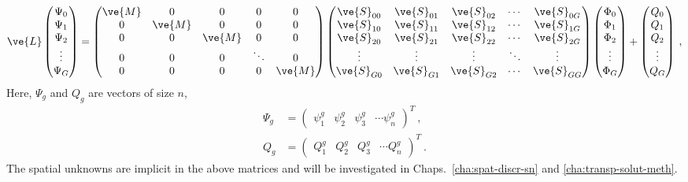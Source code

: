 \documentclass{article}
\numberwithin{equation}{subsection}
\begin{document}
\begin{equation}
    \ve{L}
    \begin{pmatrix}
      \Psi_0 \\
      \Psi_1 \\
      \Psi_2 \\
      \vdots   \\
      \Psi_G
    \end{pmatrix} =
    \begin{pmatrix}
      \ve{M} & 0 & 0 & 0 & 0 \\
      0 & \ve{M} & 0 & 0 & 0 \\
      0 & 0 & \ve{M} & 0 & 0 \\
      0 & 0 & 0 & \ddots & 0 \\
      0 & 0 & 0 & 0 & \ve{M} \\
    \end{pmatrix}
    \begin{pmatrix}
      \ve{S}_{00} & \ve{S}_{01} & \ve{S}_{02} & \cdots &
      \ve{S}_{0G} \\
      \ve{S}_{10} & \ve{S}_{11} & \ve{S}_{12} & \cdots &
      \ve{S}_{1G} \\
      \ve{S}_{20} & \ve{S}_{21} & \ve{S}_{22} & \cdots &
      \ve{S}_{2G} \\
      \vdots & \vdots & \vdots & \ddots & \vdots \\
      \ve{S}_{G0} & \ve{S}_{G1} & \ve{S}_{G2} & \cdots &
      \ve{S}_{GG}
    \end{pmatrix}
    \begin{pmatrix}
      \Phi_0 \\
      \Phi_1 \\
      \Phi_2 \\
      \vdots   \\
      \Phi_G
    \end{pmatrix}
    +
    \begin{pmatrix}
      Q_0 \\
      Q_1 \\
      Q_2 \\
      \vdots   \\
      Q_G
    \end{pmatrix}\:,
    \label{eq:matrix-transport}
\end{equation}
Here, $\Psi_g$ and $Q_g$ are vectors of size $n$,
\begin{align}
  \Psi_g &= \begin{pmatrix}
    \psi^g_1 & \psi^g_2 & \psi^g_3 & \cdots \psi^g_n
  \end{pmatrix}^T\:,\\
  Q_g &= \begin{pmatrix}
    Q^g_1 & Q^g_2 & Q^g_3 & \cdots Q^g_n
  \end{pmatrix}^T\:.
\end{align}
The spatial unknowns are implicit in the above matrices and will be
investigated in Chaps.~\ref{cha:spat-discr-sn} and
\ref{cha:transp-solut-meth}.
\end{document}
